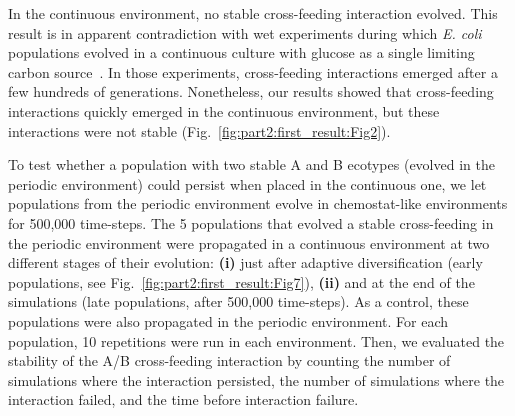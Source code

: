 In the continuous environment, no stable cross-feeding interaction evolved. This result is in apparent contradiction with wet experiments during which \textit{E. coli} populations evolved in a continuous culture with glucose as a single limiting carbon source~\citep{helling-et-al-1987,rosenzweig-et-al-1994,treves-et-al-1998}. In those experiments, cross-feeding interactions emerged after a few hundreds of generations.
Nonetheless, our results showed that cross-feeding interactions quickly emerged in the continuous environment, but these interactions were not stable (Fig.~\ref{fig:part2:first_result:Fig2}).

To test whether a population with two stable A and B ecotypes (evolved in the periodic environment) could persist when placed in the continuous one, we let populations from the periodic environment evolve in chemostat-like environments for 500,000 time-steps. The 5 populations that evolved a stable cross-feeding in the periodic environment were propagated in a continuous environment at two different stages of their evolution: {\bf (i)} just after adaptive diversification (early populations, see Fig.~\ref{fig:part2:first_result:Fig7}), {\bf (ii)} and at the end of the simulations (late populations, after 500,000 time-steps). As a control, these populations were also propagated in the periodic environment. For each population, 10 repetitions were run in each environment. Then, we evaluated the stability of the A/B cross-feeding interaction by counting the number of simulations where the interaction persisted, the number of simulations where the interaction failed, and the time before interaction failure.

